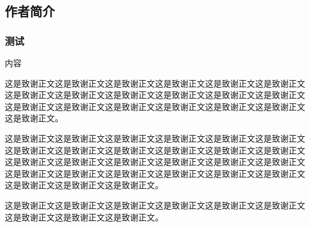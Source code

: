 \documentclass{bjfu}
\begin{document}
\subsection{作者简介}
\subsubsection{测试}
内容


\bjfuThanks
这是致谢正文这是致谢正文这是致谢正文这是致谢正文这是致谢正文这是致谢正文这是致谢正文这是致谢正文这是致谢正文这是致谢正文这是致谢正文这是致谢正文这是致谢正文这是致谢正文这是致谢正文这是致谢正文这是致谢正文这是致谢正文这是致谢正文。

这是致谢正文这是致谢正文这是致谢正文这是致谢正文这是致谢正文这是致谢正文这是致谢正文这是致谢正文这是致谢正文这是致谢正文这是致谢正文这是致谢正文这是致谢正文这是致谢正文这是致谢正文这是致谢正文这是致谢正文这是致谢正文这是致谢正文这是致谢正文这是致谢正文这是致谢正文这是致谢正文这是致谢正文这是致谢正文这是致谢正文这是致谢正文。

这是致谢正文这是致谢正文这是致谢正文这是致谢正文这是致谢正文这是致谢正文这是致谢正文这是致谢正文这是致谢正文。



\end{document}
